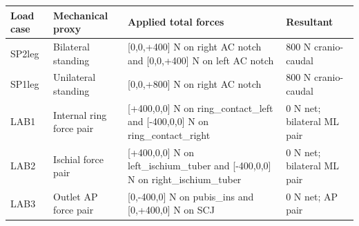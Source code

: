 \begin{tabular}{llll}
\toprule
Load case & Mechanical proxy & Applied total forces & Resultant \\
\midrule
SP2leg & Bilateral standing & [0,0,+400] N on right AC notch and [0,0,+400] N on left AC notch & 800 N cranio-caudal \\
SP1leg & Unilateral standing & [0,0,+800] N on right AC notch & 800 N cranio-caudal \\
LAB1 & Internal ring force pair & [+400,0,0] N on ring\_contact\_left and [-400,0,0] N on ring\_contact\_right & 0 N net; bilateral ML pair \\
LAB2 & Ischial force pair & [+400,0,0] N on left\_ischium\_tuber and [-400,0,0] N on right\_ischium\_tuber & 0 N net; bilateral ML pair \\
LAB3 & Outlet AP force pair & [0,-400,0] N on pubis\_ins and [0,+400,0] N on SCJ & 0 N net; AP pair \\
\bottomrule
\end{tabular}
